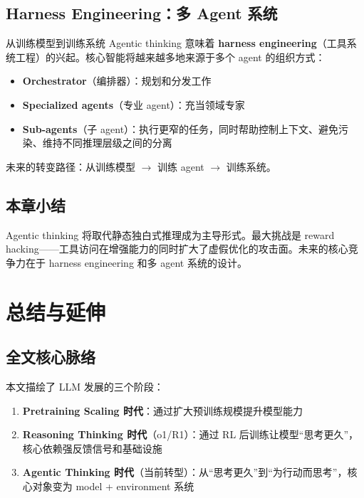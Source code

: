 \documentclass[a4paper]{article}
\begin{document}
\subsection{Harness Engineering：多 Agent 系统}

\begin{knowledgebox}{从训练模型到训练系统}
Agentic thinking 意味着 \textbf{harness engineering}（工具系统工程）的兴起。核心智能将越来越多地来源于多个 agent 的组织方式：
\begin{itemize}
    \item \textbf{Orchestrator}（编排器）：规划和分发工作
    \item \textbf{Specialized agents}（专业 agent）：充当领域专家
    \item \textbf{Sub-agents}（子 agent）：执行更窄的任务，同时帮助控制上下文、避免污染、维持不同推理层级之间的分离
\end{itemize}
未来的转变路径：从训练模型 $\rightarrow$ 训练 agent $\rightarrow$ 训练系统。
\end{knowledgebox}

\subsection{本章小结}

Agentic thinking 将取代静态独白式推理成为主导形式。最大挑战是 reward hacking——工具访问在增强能力的同时扩大了虚假优化的攻击面。未来的核心竞争力在于 harness engineering 和多 agent 系统的设计。


\section{总结与延伸}

\subsection{全文核心脉络}

本文描绘了 LLM 发展的三个阶段：

\begin{enumerate}
    \item \textbf{Pretraining Scaling 时代}：通过扩大预训练规模提升模型能力
    \item \textbf{Reasoning Thinking 时代}（o1/R1）：通过 RL 后训练让模型``思考更久''，核心依赖强反馈信号和基础设施
    \item \textbf{Agentic Thinking 时代}（当前转型）：从``思考更久''到``为行动而思考''，核心对象变为 model + environment 系统
\end{enumerate}
\end{document}
